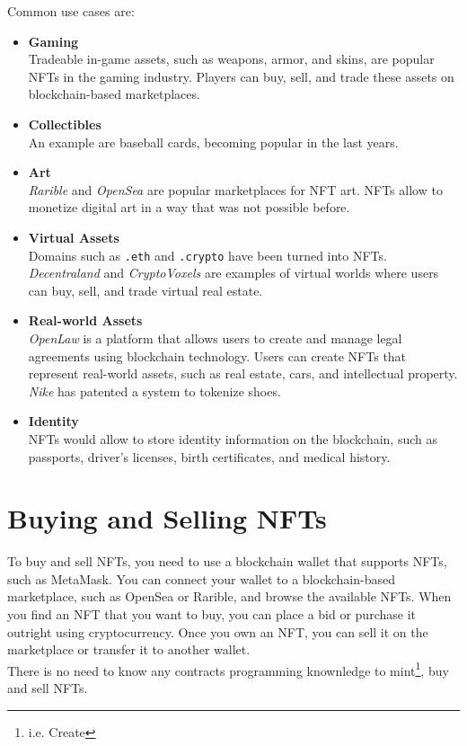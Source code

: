 Common use cases are:
\begin{itemize}
   \item \textbf{Gaming}\\
   Tradeable in-game assets, such as weapons, armor, and skins, are popular NFTs in the gaming industry. Players can buy, sell, and trade these assets on blockchain-based marketplaces.
   \item \textbf{Collectibles}\\
   An example are baseball cards, becoming popular in the last years.
   \item \textbf{Art}\\
   \textit{Rarible} and \textit{OpenSea} are popular marketplaces for NFT art. NFTs allow to monetize digital art in a way that was not possible before.
   \item \textbf{Virtual Assets}\\
   Domains such as \texttt{.eth} and \texttt{.crypto} have been turned into NFTs.\\
   \textit{Decentraland} and \textit{CryptoVoxels} are examples of virtual worlds where users can buy, sell, and trade virtual real estate.
   \item \textbf{Real-world Assets}\\
   \textit{OpenLaw} is a platform that allows users to create and manage legal agreements using blockchain technology. Users can create NFTs that represent real-world assets, such as real estate, cars, and intellectual property.\\
   \textit{Nike} has patented a system to tokenize shoes. 
   \item \textbf{Identity}\\
   NFTs would allow to store identity information on the blockchain, such as passports, driver's licenses, birth certificates, and medical history.
\end{itemize}

\section{Buying and Selling NFTs}
To buy and sell NFTs, you need to use a blockchain wallet that supports NFTs, such as MetaMask. You can connect your wallet to a blockchain-based marketplace, such as OpenSea or Rarible, and browse the available NFTs. When you find an NFT that you want to buy, you can place a bid or purchase it outright using cryptocurrency. Once you own an NFT, you can sell it on the marketplace or transfer it to another wallet.\\
There is no need to know any contracts programming knownledge to mint\footnote{i.e. Create}, buy and sell NFTs. 

